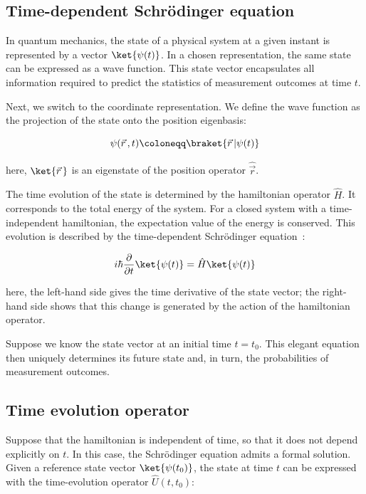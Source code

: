 \subsection{Time-dependent Schrödinger equation}

In quantum mechanics, the state of a physical system at a given instant is represented by a vector $\ket{\psi(t)}$.
In a chosen representation, the same state can be expressed as a wave function.
This state vector encapsulates all information required to predict the statistics of measurement outcomes at time $t$.

Next, we switch to the coordinate representation.
We define the wave function as the projection of the state onto the position eigenbasis:

\begin{equation}
    \psi(\vec{r}\,,t)\coloneqq \braket{\vec{r}\,|\psi(t)}
\label{coordinate_representation_definition}
\end{equation}

here, $\ket{\vec{r}\,}$ is an eigenstate of the position operator $\hat{\vec{r}}$.

The time evolution of the state is determined by the hamiltonian operator $\hat{H}$.
It corresponds to the total energy of the system.
For a closed system with a time-independent hamiltonian, the expectation value of the energy is conserved. This evolution is described by the time-dependent Schrödinger equation~\cite{shankar2012principles}:

\begin{equation}
    i\hbar\frac{\partial}{\partial t}\ket{\psi(t)}=\hat{H}\ket{\psi(t)}
\label{time-dependent_Schrodinger_equation}
\end{equation}

here, the left-hand side gives the time derivative of the state vector;
the right-hand side shows that this change is generated by the action of the hamiltonian operator.

Suppose we know the state vector at an initial time $t=t_0$. This elegant equation then uniquely determines its future state and, in turn, the probabilities of measurement outcomes.

\subsection{Time evolution operator}

Suppose that the hamiltonian is independent of time, so that it does not depend explicitly on $t$.
In this case, the Schrödinger equation admits a formal solution.
Given a reference state vector $\ket{\psi(t_0)}$,
the state at time $t$ can be expressed with the time-evolution operator $\hat{U}(t,t_0)$:

